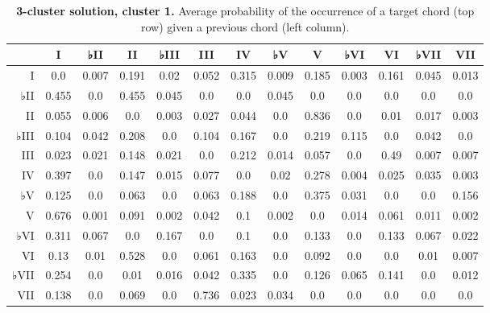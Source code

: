 \begin{table}[htbp]
\begin{minipage}{\linewidth}
\setlength{\tymax}{0.5\linewidth}
\centering
\small
\caption{\textbf{3-cluster solution, cluster 1.} Average probability of the occurrence of a target chord (top row) given a previous chord (left column).}
\label{3-clustersolutioncluster1.averageprobabilityoftheoccurrenceofatargetchordtoprowgivenapreviouschordleftcolumn.}
\begin{tabulary}{\textwidth}{@{}RCCCCCCCCCCCC@{}} \toprule
&I&♭II&II&♭III&III&IV&♭V&V&♭VI&VI&♭VII&VII\\
\midrule
I&0.0&0.007&0.191&0.02&0.052&0.315&0.009&0.185&0.003&0.161&0.045&0.013\\
♭II&0.455&0.0&0.455&0.045&0.0&0.0&0.045&0.0&0.0&0.0&0.0&0.0\\
II&0.055&0.006&0.0&0.003&0.027&0.044&0.0&0.836&0.0&0.01&0.017&0.003\\
♭III&0.104&0.042&0.208&0.0&0.104&0.167&0.0&0.219&0.115&0.0&0.042&0.0\\
III&0.023&0.021&0.148&0.021&0.0&0.212&0.014&0.057&0.0&0.49&0.007&0.007\\
IV&0.397&0.0&0.147&0.015&0.077&0.0&0.02&0.278&0.004&0.025&0.035&0.003\\
♭V&0.125&0.0&0.063&0.0&0.063&0.188&0.0&0.375&0.031&0.0&0.0&0.156\\
V&0.676&0.001&0.091&0.002&0.042&0.1&0.002&0.0&0.014&0.061&0.011&0.002\\
♭VI&0.311&0.067&0.0&0.167&0.0&0.1&0.0&0.133&0.0&0.133&0.067&0.022\\
VI&0.13&0.01&0.528&0.0&0.061&0.163&0.0&0.092&0.0&0.0&0.01&0.007\\
♭VII&0.254&0.0&0.01&0.016&0.042&0.335&0.0&0.126&0.065&0.141&0.0&0.012\\
VII&0.138&0.0&0.069&0.0&0.736&0.023&0.034&0.0&0.0&0.0&0.0&0.0\\

\bottomrule

\end{tabulary}
\end{minipage}
\end{table}

